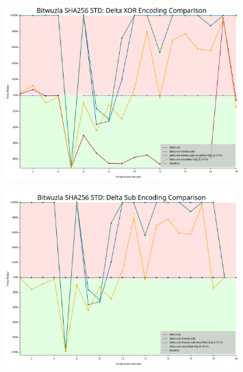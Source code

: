 \begin{figure}[H]
	\centering
	\includegraphics[width=0.8\textwidth]{../../graphs/bitwuzla_delta_xor_encoding_comparison.svg}
\end{figure}

\begin{figure}[H]
	\centering
	\includegraphics[width=0.8\textwidth]{../../graphs/bitwuzla_delta_sub_encoding_comparison.svg}
\end{figure}

